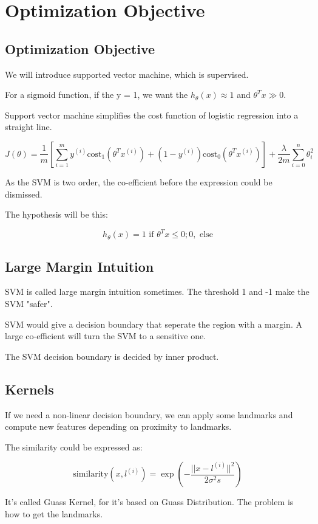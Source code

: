 \documentclass[en,11pt,english,black,simple]{../elegantbook}
\begin{document}
\fi 
\def\chapname{07optimibj}

\chapter{Optimization Objective}

\section{Optimization Objective}

We will introduce supported vector machine, which is supervised. 

For a sigmoid function, if the y = 1, we want the \(h_\theta(x)\approx 1\) and \(\theta^T x \gg 0\). 

Support vector machine simplifies the cost function of logistic regression into a straight line. 

\[J(\theta) = \frac{1}{m}\left[\sum_{i = 1}^{m} y^{(i)} \text{cost}_1 (\theta^T x^{(i)}) + (1 - y^{(i)}) \text{cost}_0 (\theta^T x^{(i)})\right] + \frac{\lambda}{2 m} \sum_{i = 0}^n \theta_i^2\]

As the SVM is two order, the co-efficient before the expression could be dismissed. 

The hypothesis will be this: 

\[h_\theta(x) = 1 \text{ if } \theta^T x \leq 0; 0, \text{ else}\]

\section{Large Margin Intuition}

SVM is called large margin intuition sometimes. The threshold 1 and -1 make the SVM "safer". 

SVM would give a decision boundary that seperate the region with a margin. A large co-efficient will turn the SVM to a sensitive one.

The SVM decision boundary is decided by inner product.

\section{Kernels}

If we need a non-linear decision boundary, we can apply some landmarks and compute new features depending on proximity to landmarks.

The similarity could be expressed as:

\[\text{similarity}(x, l^{(i)}) = \exp(-\frac{||x-l^{(i)}||^2}{2 \sigma^2s})\] 

It's called Guass Kernel, for it's based on Guass Distribution. The problem is how to get the landmarks.

\let\chapname\undefined
\ifx\mainclass\undefined
\end{document}
